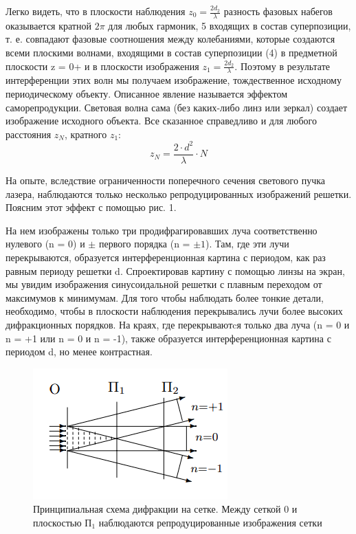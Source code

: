 \documentclass[a4paper,12pt]{article}
\begin{document}
Легко видеть, что в плоскости наблюдения $z_0 = \frac{2d_2}{\lambda}$ разность фазовых набегов оказывается кратной $2\pi$ для любых гармоник, 5 входящих
в состав суперпозиции, т. е. совпадают фазовые соотношения между
колебаниями, которые создаются всеми плоскими волнами, входящими в состав суперпозиции (4) в предметной плоскости z = 0+ и в плоскости изображения $z_1 = \frac{2d_2}{\lambda}$. Поэтому в результате интерференции этих волн мы получаем изображение, тождественное исходному периодическому объекту. Описанное явление называется эффектом саморепродукции. Световая волна сама (без каких-либо линз или зеркал) создает изображение исходного объекта. Все сказанное справедливо и для любого расстояния $z_N$, кратного $z_1$:
\begin{equation}
z_N = \frac{2 \cdot d^2}{\lambda} \cdot N
\end{equation}

На опыте, вследствие ограниченности поперечного сечения светового пучка лазера, наблюдаются только несколько репродуцированных изображений решетки. Поясним этот эффект с помощью рис. 1. 

На нем изображены только три продифрагировавших луча соответственно нулевого (n = 0) и $\pm$ первого порядка (n = $\pm 1$). Там, где эти лучи перекрываются, образуется интерференционная картина с периодом, как раз равным периоду решетки d.
Спроектировав картину с помощью линзы на экран, мы увидим изображения синусоидальной решетки с плавным переходом от максимумов к минимумам. Для того чтобы наблюдать более тонкие детали, необходимо, чтобы в плоскости наблюдения перекрывались лучи более высоких дифракционных порядков. На краях, где перекрываютcя только два луча (n = 0 и n = +1 или n = 0 и n = -1), также образуется интерференционная картина с периодом d, но менее контрастная.
\begin{figure}[H]
\centering
\includegraphics[scale=1]{scheme1.png}
\caption{Принципиальная схема дифракции на сетке. Между сеткой 0 и плоскостью $\text{П}_1$ наблюдаются репродуцированные изображения сетки}
\end{figure}
\end{document}
